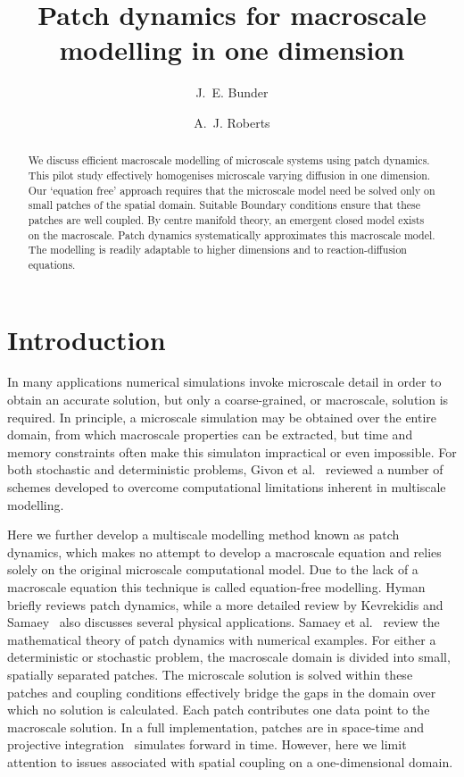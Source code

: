 \documentclass[12pt,a4paper]{article}
\title{Patch dynamics for macroscale modelling in one dimension}
\author{J.~E. Bunder}
\author{A.~J. Roberts}
\begin{document}
\maketitle

\begin{abstract}
We discuss efficient macroscale modelling of microscale systems using patch dynamics. This pilot study effectively homogenises microscale varying diffusion in one dimension. Our `equation free' approach requires that the microscale model need be solved only on small patches of the spatial domain. Suitable Boundary conditions ensure that these patches are well coupled. By centre manifold theory, an emergent closed model exists on the macroscale. Patch dynamics systematically approximates this macroscale model. The modelling is readily adaptable to higher dimensions and to reaction-diffusion equations.
\end{abstract}

\tableofcontents 

\section{Introduction}
\label{sec:intro}
In many applications numerical simulations invoke microscale detail in order to obtain an accurate solution, but only a coarse-grained, or macroscale, solution is required. In principle, a microscale simulation may be obtained over the entire domain, from which macroscale properties can be extracted, but time and memory constraints often make this simulaton impractical or even impossible. For both stochastic and deterministic problems, Givon et al.~\cite{Givon04} reviewed a number of schemes developed to overcome computational limitations inherent in multiscale modelling. 

Here we further develop a multiscale modelling method known as patch dynamics, which makes no attempt to develop a macroscale equation and relies solely on the original microscale computational model.
Due to the lack of a macroscale equation this technique is called equation-free modelling. Hyman~\cite{Hyman05} briefly reviews patch dynamics, while a more detailed review by Kevrekidis and Samaey~\cite{Kevrekidis09} also discusses several physical applications. Samaey et al.~\cite{Samaey10} review the mathematical theory of patch dynamics with numerical examples. For either a deterministic or stochastic problem, the macroscale domain is divided into small, spatially separated patches. The microscale solution is solved within these patches and coupling conditions effectively bridge the gaps in the domain over which no solution is calculated. Each patch contributes one data point to the macroscale solution. In a full implementation, patches are in space-time and projective integration~\cite{Samaey05} simulates forward in time. However, here we limit attention to issues associated with spatial coupling on a one-dimensional domain.
\end{document}
